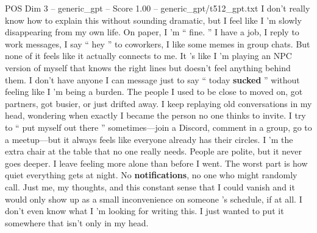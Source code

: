 \begin{textsample}{POS Dim 3 – generic\_gpt – Score 1.00 – generic\_gpt/t512\_gpt.txt}  \label{ex:f3_pos_037}
I don't really know how to explain this without sounding dramatic, but I feel like I ’m slowly disappearing from my own life.
On paper, I ’m “ fine. ” I have a job, I reply to work messages, I say “ hey ” to coworkers, I like some memes in group chats.
But none of it feels like it actually connects to me.
It ’s like I ’m playing an NPC version of myself that knows the right lines but doesn't feel anything behind them.
I don't have anyone I can message just to say “ today \textbf{sucked} ” without feeling like I ’m being a burden.
The people I used to be close to moved on, got partners, got busier, or just drifted away.
I keep replaying old conversations in my head, wondering when exactly I became the person no one thinks to invite.
I try to “ put myself out there ” sometimes—join a Discord, comment in a group, go to a meetup—but it always feels like everyone already has their circles.
I ’m the extra chair at the table that no one really needs.
People are polite, but it never goes deeper.
I leave feeling more alone than before I went.
The worst part is how quiet everything gets at night.
No \textbf{notifications}, no one who might randomly call.
Just me, my thoughts, and this constant sense that I could vanish and it would only show up as a small inconvenience on someone ’s schedule, if at all.
I don't even know what I ’m looking for writing this.
I just wanted to put it somewhere that isn't only in my head.

\end{textsample}
